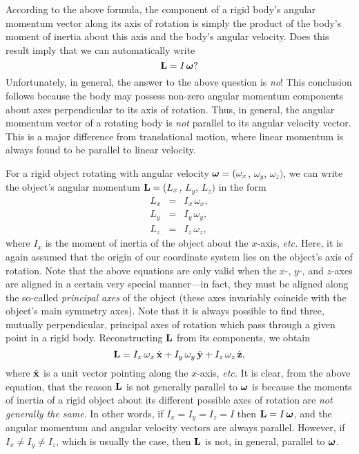 According to the above formula, the component of a rigid body's angular
momentum vector along its axis of rotation  is simply the product
of the body's moment of inertia about this axis and the body's angular velocity.
Does this result  imply that we can automatically write
\begin{equation}
{\bf L} = I \,\mbox{\boldmath$\omega$}?
\end{equation}
Unfortunately, in general, the answer to the above question is {\em no}! This 
conclusion follows because the
body may possess non-zero angular momentum components about axes perpendicular to
its axis of rotation. Thus, in general, the angular momentum vector of a rotating body
is {\em not} parallel to its angular velocity vector. This is a major difference from
translational motion, where linear momentum is always found to be parallel
to linear velocity. 

For a rigid object rotating with angular velocity $\mbox{\boldmath$\omega$} = (\omega_x$, $\omega_y$,
$\omega_z)$, we can write the object's angular momentum ${\bf L} = (L_x$, $L_y$,
$L_z)$ in the form
\begin{eqnarray}
L_x &=& I_x\,\omega_x,\\[0.5ex]
L_y &=& I_y\,\omega_y,\\[0.5ex]
L_z &=& I_z\,\omega_z,
\end{eqnarray}
where $I_x$ is the moment of inertia of the object about the $x$-axis, {\em etc.} Here, it is
again assumed that the origin of our coordinate system lies on the object's
axis of rotation. Note that the above equations are only valid when the $x$-, $y$-, and
$z$-axes are aligned in a certain very special manner---in fact, they must be aligned along the
so-called {\em principal axes} of the object (these axes invariably coincide with the object's
main symmetry axes). Note that it is always possible to find three, mutually perpendicular,
principal axes of rotation which pass through a given point in a rigid body.
 Reconstructing ${\bf L}$ from its components, we obtain
\begin{equation}\label{e93}
{\bf L} = I_x\,\omega_x\,\hat{\bf x} + I_y\,\omega_y\,\hat{\bf y} + I_z\,\omega_z\,\hat{\bf z},
\end{equation}
where $\hat{\bf x}$ is a unit vector pointing along the $x$-axis, {\em etc.}
It is clear, from the above equation, that the reason ${\bf L}$ is not generally parallel
to $\mbox{\boldmath$\omega$}$ is because the moments of inertia of a rigid object about
its  different
possible axes of rotation are {\em not generally the same}. In other words, if $I_x=I_y=I_z=I$ then
${\bf L} = I\,\mbox{\boldmath$\omega$}$, and the angular momentum and angular velocity vectors
are always parallel. However, if $I_x\neq I_y\neq I_z$, which is usually the case,
 then ${\bf L}$ is not, in general, 
parallel to $\mbox{\boldmath$\omega$}$. 

